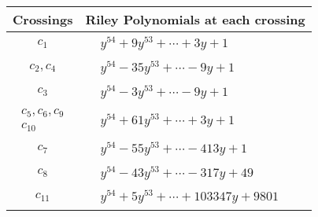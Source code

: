 \documentclass[1p]{elsarticle_modified}
\theoremstyle{definition}
\begin{document}
\begin{tabular}{m{50pt}|m{274pt}}
Crossings & \hspace{64pt}Riley Polynomials at each crossing \\
\hline $$\begin{aligned}c_{1}\end{aligned}$$&$\begin{aligned}
&y^{54}+9 y^{53}+\cdots+3 y+1
\end{aligned}$\\
\hline $$\begin{aligned}c_{2},c_{4}\end{aligned}$$&$\begin{aligned}
&y^{54}-35 y^{53}+\cdots-9 y+1
\end{aligned}$\\
\hline $$\begin{aligned}c_{3}\end{aligned}$$&$\begin{aligned}
&y^{54}-3 y^{53}+\cdots-9 y+1
\end{aligned}$\\
\hline $$\begin{aligned}c_{5},c_{6},c_{9}\\c_{10}\end{aligned}$$&$\begin{aligned}
&y^{54}+61 y^{53}+\cdots+3 y+1
\end{aligned}$\\
\hline $$\begin{aligned}c_{7}\end{aligned}$$&$\begin{aligned}
&y^{54}-55 y^{53}+\cdots-413 y+1
\end{aligned}$\\
\hline $$\begin{aligned}c_{8}\end{aligned}$$&$\begin{aligned}
&y^{54}-43 y^{53}+\cdots-317 y+49
\end{aligned}$\\
\hline $$\begin{aligned}c_{11}\end{aligned}$$&$\begin{aligned}
&y^{54}+5 y^{53}+\cdots+103347 y+9801
\end{aligned}$\\
\hline
\end{tabular}
\vskip 2pc
\end{document}

